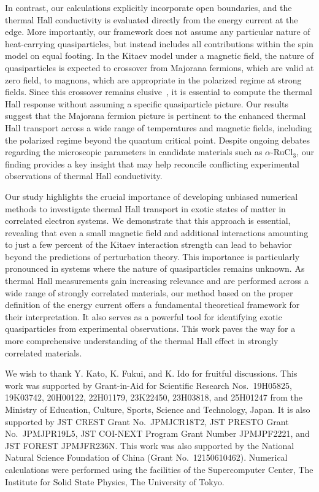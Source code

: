 \documentclass[twocolumn,superscriptaddress,showpacs, longbibliography, aps, prx]{revtex4-2}
\begin{document}
In contrast, our calculations explicitly incorporate open boundaries, and the thermal Hall conductivity is evaluated directly from the energy current at the edge. 
More importantly, our framework does not assume any particular nature of heat-carrying quasiparticles, but instead includes all contributions within the spin model on equal footing. 
In the Kitaev model under a magnetic field, the nature of quasiparticles is expected to crossover from Majorana fermions, which are valid at zero field, to magnons, which are appropriate in the polarized regime at strong fields. 
Since this crossover remains elusive~\cite{WinterRMCHV2017,YoshitakeNKM2020}, it is essential to compute the thermal Hall response without assuming a specific quasiparticle picture. 
Our results suggest that the Majorana fermion picture is pertinent to the enhanced thermal Hall transport across a wide range of temperatures and magnetic fields, including the polarized regime beyond the quantum critical point. 
Despite ongoing debates regarding the microscopic parameters in candidate materials such as $\alpha$-RuCl$_3$, our finding provides a key insight that may help reconcile conflicting experimental observations of thermal Hall conductivity. 

Our study highlights the crucial importance of developing unbiased numerical methods to investigate thermal Hall transport in exotic states of matter in correlated electron systems. 
We demonstrate that this approach is essential, revealing that even a small magnetic field and additional interactions amounting to just a few percent of the Kitaev interaction strength can lead to behavior beyond the predictions of perturbation theory. 
This importance is particularly pronounced in systems where the nature of quasiparticles remains unknown. 
As thermal Hall measurements gain increasing relevance and are performed across a wide range of strongly correlated materials, our method based on the proper definition of the energy current offers a fundamental theoretical framework for their interpretation. 
It also serves as a powerful tool for identifying exotic quasiparticles from experimental observations. This work paves the way for a more comprehensive understanding of the thermal Hall effect in strongly correlated materials.

\begin{acknowledgments}
We wish to thank Y. Kato, K. Fukui, and K. Ido for fruitful discussions.
This work was supported by  Grant-in-Aid for Scientific Research
Nos.~19H05825, 19K03742, 20H00122, 	22H01179, 23K22450, 23H03818, and 25H01247 from the Ministry of Education, Culture, Sports, Science and Technology, Japan.
It is also supported by JST CREST Grant No.~JPMJCR18T2, JST PRESTO Grant No.~JPMJPR19L5, JST COI-NEXT Program Grant Number JPMJPF2221, and JST FOREST JPMJFR236N. This work was also supported by the National Natural Science Foundation of China (Grant No.~12150610462). Numerical calculations were performed using the facilities of the Supercomputer Center, The Institute for Solid State Physics, The University of Tokyo.
\end{acknowledgments}
\end{document}
